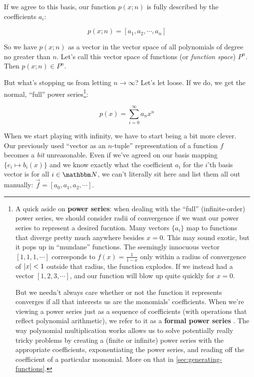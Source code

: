 \documentclass[../main/main.tex]{subfiles}
\begin{document}
If we agree to this basis,
our function \(p(x;n)\) is fully described by the coefficients \(a_i\):

\[p(x;n) = \left[a_1, a_2, \cdots, a_n\right]\]

So we have \(p(x;n)\) as a vector
in the vector space of all polynomials
of degree no greater than \(n\).
Let's call this vector space of functions
(or \emph{function space}) \(P^n\).
Then \(p(x;n) \in P^n\).
\par


But what's stopping us from
letting \(n \rightarrow \infty\)?
Let's let loose.
If we do, we get the normal, ``full'' power series\footnote{
A quick aside on \textbf{power series}:
when dealing with the ``full'' (infinite-order) power series,
we should consider radii of convergence if we want our 
power series to represent a desired fucntion.
Many vectors \(\{a_i\}\) map to functions that diverge
pretty much anywhere besides \(x=0\). 
This may sound exotic, but it pops up in ``mundane'' functions.
The seemingly innocuous vector 
\(\left[1, 1, 1, \cdots\right]\) corresponds
to \(f(x) = \frac{1}{1-x}\) only within a radius of
convergence of \(\abs{x} < 1\) 
\textemdash{} outside that radius, the function explodes. If we instead had a vector
\(\left[1, 2, 3, \cdots \right]\), and our function will
blow up quite quickly for \(x=0\).\par

But we needn't always care whether or not the function it
represents converges if all that interests us 
are the monomials' coefficients. 
When we're viewing a power series just as a sequence of
coefficients 
(with operations that reflect
polynomial arithmetic), we refer to it as a
\textbf{formal power series}
.
The way polynomial multiplication works allows us to
solve potentially really tricky problems by creating a
(finite or infinite) power series with the appropriate
coefficients, exponentiating the power series,
and reading off the coefficient of a particular monomial.
More on that in \ref{sec:generating-functions}.
}:

\[p(x) = \sum_{i=0}^{\infty}a_n x^n\]


When we start playing with infinity, we have to start
being a bit more clever.
Our previously used ``vector as an \(n\)-tuple''
representation of a function \(f\) becomes a \emph{bit}
unreasonable. Even if we've agreed on our basis mapping
\(\{e_i \mapsto b_i(x)\}\)
and we know exactly what the coefficient \(a_i\)
for the \(i\)'th basis vector is for all \(i \in \domain{N}\),
we can't literally sit here and list them all out manually:
\(\vec{f} = \left[a_0, a_1, a_2, \cdots \right]\). \par
\end{document}
